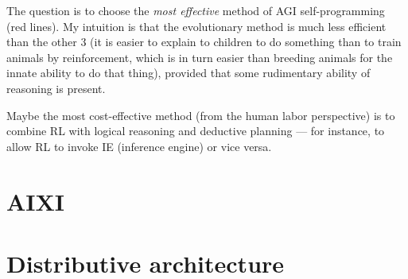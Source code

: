 The question is to choose the \textit{most effective} method of AGI self-programming (red lines).  My intuition is that the evolutionary method is much less efficient than the other 3 (it is easier to explain to children to do something than to train animals by reinforcement, which is in turn easier than breeding animals for the innate ability to do that thing), provided that some rudimentary ability of reasoning is present.

Maybe the most cost-effective method (from the human labor perspective) is to combine RL with logical reasoning and deductive planning --- for instance, to allow RL to invoke IE (inference engine) or vice versa.

\section{AIXI}

\section{Distributive architecture}
